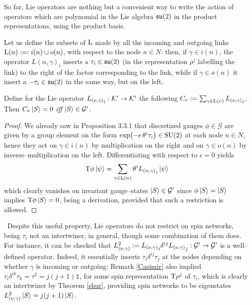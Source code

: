 So far, Lie operators are nothing but a convenient way to write the action of operators which are polynomial in the Lie algebra $\mathfrak{su}(2)$ in the product representations, using the product basis.

Let us define the subsets of $\text{\normalfont L}$ made by all the incoming and outgoing links $\text{\normalfont L}(n):=:i(n)\cup o(n)$, with respect to the node $n\in N$: then, if $\gamma\in i(n)$, the operator ${L(n,\gamma)}_i$ inserts a $\tau_i\in\mathfrak{su}(2)$ (in the representation $\rho^j$ labelling the link) to the right of the factor corresponding to the link, while if $\gamma\in o(n)$ it insert a $-\tau_i\in\mathfrak{su}(2)$ in the same way, but on the left.

\begin{prop}\label{quantum_closure}
    {Define for the Lie operator ${L_{(\nu,\gamma)}}_i:\mathcal{K}'\to\mathcal{K}'$ the following $C_\nu:=\sum_{\gamma\in\text{\normalfont L}(\nu)}{L_{(\nu,\gamma)}}_i$. Then $C_\nu\left| S \right >=0$ \emph{iff} $\left| S \right >\in\mathcal{G}'$}.
\end{prop}
\begin{proof}

We already saw in Proposition 3.3.1 that discretized gauges $\phi\in\mathscr{G}$ are given by a group element on the form $\exp(-\epsilon\,\theta^i\tau_i)\in\text{\normalfont SU}(2)$ at each node $n\in N$, hence they act on $\gamma\in i(n)$ by multiplication on the right and on $\gamma\in o(n)$ by inverse--multiplication on the left. Differentiating with respect to $\epsilon=0$ yields
$$\text{\normalfont T}\phi\left| \psi \right >=\sum_{\gamma\in\text{\normalfont L}(n)}\theta^i{L_{(n,\gamma)}}_i\left| \psi \right >$$
which clearly vanishes on invariant gauge--states $\left| S \right >\in\mathcal{G}'$ since $\phi\left| S \right >=\left| S \right >$ implies $\text{\normalfont T}\phi\left| S \right >=0$, being a derivation, provided that such a restriction is allowed.
\end{proof}
\,\newline
Despite this useful property, Lie operators do not restrict on spin networks, being $\tau_i$ not an intertwiner, in general, though some combination of them does. For instance, it can be checked that ${L^2_{(\nu,\gamma)}}:={L_{(\nu,\gamma)}}_i\delta^{ij}{L_{(\nu,\gamma)}}_j:\mathcal{G}'\to\mathcal{G}'$ is a well--defined operator. Indeed, it essentially inserts $\tau_i\delta^{ij}\tau_j$ at the nodes depending on whether $\gamma$ is incoming or outgoing: Remark \ref{Casimir} also implied $\tau_i\delta^{ik}\tau_k=\tau^2=j(j+1)\mathbb{1}$, for some spin representation $\text{\normalfont T}\rho^j$ of $\tau_i$,   which is clearly an intertwiner by Theorem \ref{shur}, providing spin networks to be eigenstates $L^2_{(\nu,\gamma)}\left| S \right >=j(j+1)\left| S \right >$. %



